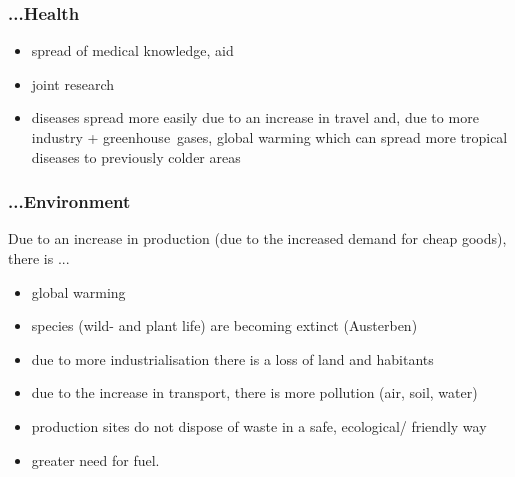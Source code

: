 \documentclass[a5paper,12pt,twoside,titlepage]{scrartcl}
\begin{document}
\subsubsection{...Health}
	\begin{itemize}
		\item spread of medical knowledge, aid
		\item joint research
		\item diseases spread more easily due to an increase in travel and, due to more industry + \glqq greenhouse\grqq\ gases, global warming which can spread more tropical diseases to previously colder areas
	\end{itemize}
\subsubsection{...Environment}
Due to an increase in production (due to the increased demand for cheap goods), there is ...
	\begin{itemize} 
		\item global warming
		\item species (wild- and plant life) are becoming extinct (Austerben)
		\item due to more industrialisation there is a loss of land and habitants
		\item due to the increase in transport, there is more pollution (air, soil, water)
		\item production sites do not dispose of waste in a safe, ecological/ friendly way
		\item greater need for fuel.
	\end{itemize}
\end{document}
